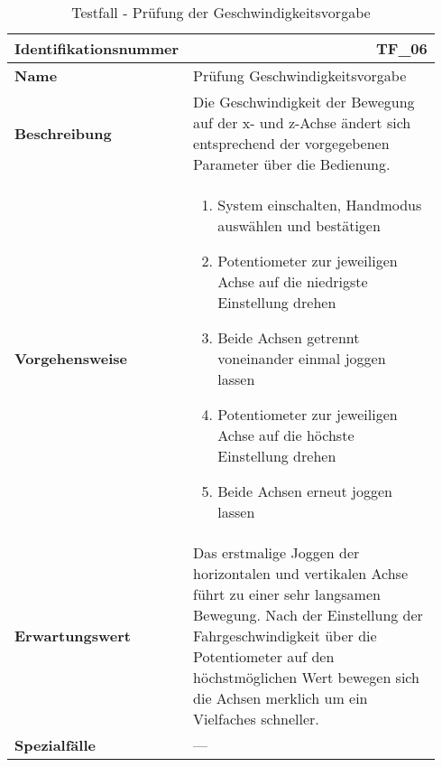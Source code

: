 \documentclass[../../../Bachelorarbeit.tex]{subfiles}
\begin{document}
\begin{table}[H]
    \centering
    \begin{tabular}{ p{0.34\linewidth}  p{0.6\linewidth} }
        \hline
        \textbf{Identifikationsnummer}  & \multicolumn{1}{r}{TF\_06} \\ \hline
        \textbf{Name}                   & Prüfung Geschwindigkeitsvorgabe \\
        \textbf{Beschreibung}           & Die Geschwindigkeit der Bewegung auf der x- und z-Achse ändert sich entsprechend der vorgegebenen Parameter über die Bedienung. \\
        \textbf{Vorgehensweise}         &   {\begin{enumerate}[noitemsep,topsep=0pt,parsep=0pt,partopsep=0pt,leftmargin=*]
                                                \item System einschalten, Handmodus auswählen und bestätigen
                                                \item Potentiometer zur jeweiligen Achse auf die niedrigste Einstellung drehen
                                                \item Beide Achsen getrennt voneinander einmal joggen lassen
                                                \item Potentiometer zur jeweiligen Achse auf die höchste Einstellung drehen
                                                \item Beide Achsen erneut joggen lassen
                                            \end{enumerate}} \\
        \textbf{Erwartungswert}         & Das erstmalige Joggen der horizontalen und vertikalen Achse führt zu einer sehr langsamen Bewegung. Nach der Einstellung der Fahrgeschwindigkeit über die Potentiometer auf den höchstmöglichen Wert bewegen sich die Achsen merklich um ein Vielfaches schneller. \\
        \textbf{Spezialfälle}           & --- \\ \hline
    \end{tabular}
    \caption[\acs{tf} - Geschwindigkeitsvorgabe]{Testfall - Prüfung der Geschwindigkeitsvorgabe}
    \label{tab:my-table65}
\end{table}
\end{document}
